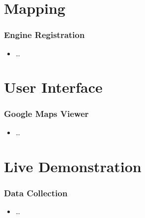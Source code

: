 \documentclass{beamer}
\begin{document}
\section{Mapping}

\begin{frame}\frametitle{Engine Registration} %
\begin{itemize}
\item \ldots
\end{itemize} 
\end{frame}

\section{User Interface}

\begin{frame}\frametitle{Google Maps Viewer} %
\begin{itemize}
\item \ldots
\end{itemize} 
\end{frame}


\section{Live Demonstration}

\begin{frame}\frametitle{Data Collection} %
\begin{itemize}
\item \ldots
\end{itemize} 
\end{frame}

\end{document}
